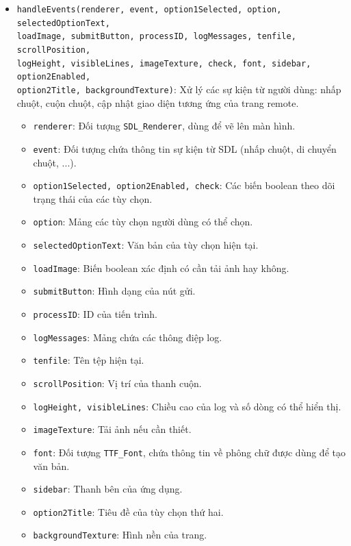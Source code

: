 \begin{itemize}
    \item \texttt{handleEvents(renderer, event, option1Selected, option, selectedOptionText,\\ loadImage, submitButton, processID, logMessages, tenfile, scrollPosition,\\ logHeight, visibleLines, imageTexture, check, font, sidebar, option2Enabled,\\ option2Title, backgroundTexture)}: Xử lý các sự kiện từ người dùng: nhấp chuột, cuộn chuột, cập nhật giao diện tương ứng của trang remote.
    \begin{itemize}
        \item \texttt{renderer}: Đối tượng \texttt{SDL\_Renderer}, dùng để vẽ lên màn hình.
        \item \texttt{event}: Đối tượng chứa thông tin sự kiện từ SDL (nhấp chuột, di chuyển chuột, ...).
        \item \texttt{option1Selected, option2Enabled, check}: Các biến boolean theo dõi trạng thái của các tùy chọn.
        \item \texttt{option}: Mảng các tùy chọn người dùng có thể chọn.
        \item \texttt{selectedOptionText}: Văn bản của tùy chọn hiện tại.
        \item \texttt{loadImage}: Biến boolean xác định có cần tải ảnh hay không.
        \item \texttt{submitButton}: Hình dạng của nút gửi.
        \item \texttt{processID}: ID của tiến trình.
        \item \texttt{logMessages}: Mảng chứa các thông điệp log.
        \item \texttt{tenfile}: Tên tệp hiện tại.
        \item \texttt{scrollPosition}: Vị trí của thanh cuộn.
        \item \texttt{logHeight, visibleLines}: Chiều cao của log và số dòng có thể hiển thị.
        \item \texttt{imageTexture}: Tải ảnh nếu cần thiết.
        \item \texttt{font}: Đối tượng \texttt{TTF\_Font}, chứa thông tin về phông chữ được dùng để tạo văn bản.
        \item \texttt{sidebar}: Thanh bên của ứng dụng.
        \item \texttt{option2Title}: Tiêu đề của tùy chọn thứ hai.
        \item \texttt{backgroundTexture}: Hình nền của trang.
    \end{itemize}


\end{itemize}
